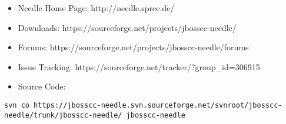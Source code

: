 \begin{itemize}
	\item Needle Home Page: http://needle.spree.de/
	\item Downloads:              https://sourceforge.net/projects/jbosscc-needle/
	\item Forums:                 https://sourceforge.net/projects/jbosscc-needle/forums
	\item Issue Tracking:         https://sourceforge.net/tracker/?group\_id=306915
	\item Source Code:
\end{itemize}

\begin{lstlisting}[caption=Source Code]
svn co https://jbosscc-needle.svn.sourceforge.net/svnroot/jbosscc-needle/trunk/jbosscc-needle/ jbosscc-needle
\end{lstlisting}
